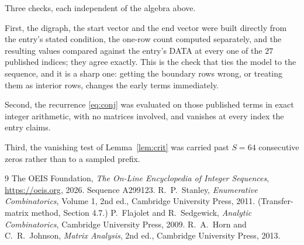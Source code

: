 \documentclass[11pt,a4paper]{article}
\theoremstyle{plain}
\theoremstyle{definition}
\begin{document}
Three checks, each independent of the algebra above.

First, the digraph, the start vector and the end vector were built directly from the
entry's stated condition, the one-row count computed separately, and the resulting values
compared against the entry's DATA at every one of the $27$ published indices; they
agree exactly. This is the check that ties the model to the sequence, and it is a sharp one:
getting the boundary rows wrong, or treating them as interior rows, changes the early terms
immediately.

Second, the recurrence \eqref{eq:conj} was evaluated on those published terms in exact
integer arithmetic, with no matrices involved, and vanishes at every index the entry claims.

Third, the vanishing test of Lemma~\ref{lem:crit} was carried past $S=64$ consecutive
zeros rather than to a sampled prefix.

\begin{thebibliography}{9}
 The OEIS Foundation, \emph{The On-Line Encyclopedia of Integer
Sequences}, \url{https://oeis.org}, 2026. Sequence A299123.
 R.~P.~Stanley, \emph{Enumerative Combinatorics}, Volume 1, 2nd ed.,
Cambridge University Press, 2011. (Transfer-matrix method, Section 4.7.)
 P.~Flajolet and R.~Sedgewick, \emph{Analytic Combinatorics}, Cambridge
University Press, 2009.
 R.~A.~Horn and C.~R.~Johnson, \emph{Matrix Analysis}, 2nd ed., Cambridge
University Press, 2013.
\end{thebibliography}
\end{document}
